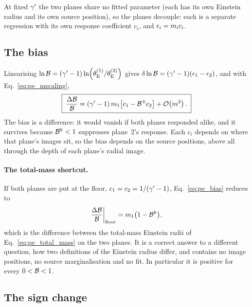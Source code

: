 At fixed $\gamma'$ the two planes share no fitted parameter (each has its
own Einstein radius and its own source position), so the planes
decouple: each is a separate regression with its own response
coefficient $c_i$, and $\epsilon_i=m_i c_i$.

\subsection{The bias}

Linearising $\ln\mathcal{B}=(\gamma'-1)\ln(\theta_{\mathrm{E}}^{(1)}/\theta_{\mathrm{E}}^{(2)})$ gives
$\delta\ln\mathcal{B}=(\gamma'-1)(\epsilon_1-\epsilon_2)$, and with
Eq.~\eqref{eq:pe_mscaling},
\begin{equation}
    \boxed{\;
    \frac{\Delta\mathcal{B}}{\mathcal{B}}=(\gamma'-1)\,m_1\bigl[c_1-\mathcal{B}^{\,k}c_2\bigr]
    +\mathcal{O}\!\left(m^2\right).\;}
    \label{eq:pe_bias}
\end{equation}
The bias is a difference: it would vanish if both planes
responded alike, and it survives because $\mathcal{B}^{k}<1$ suppresses
plane~2's response. Each $c_i$ depends on where that plane's images
sit, so the bias depends on the source positions, above all through
the depth of each plane's radial image.

\paragraph{The total-mass shortcut.} If both planes are put at the
floor, $c_1=c_2=1/(\gamma'-1)$, Eq.~\eqref{eq:pe_bias} reduces to
\begin{equation}
    \frac{\Delta\mathcal{B}}{\mathcal{B}}\bigg|_{\rm floor}=m_1\bigl(1-\mathcal{B}^{k}\bigr),
    \label{eq:pe_shortcut}
\end{equation}
which is the difference between the total-mass Einstein radii of
Eq.~\eqref{eq:pe_total_mass} on the two planes. It is a correct answer
to a different question, how two definitions of the Einstein
radius differ, and contains no image positions, no source
marginalisation and no fit. In particular it is positive for every
$0<\mathcal{B}<1$.

\subsection{The sign change}
\label{sec:pe_sign_change}

